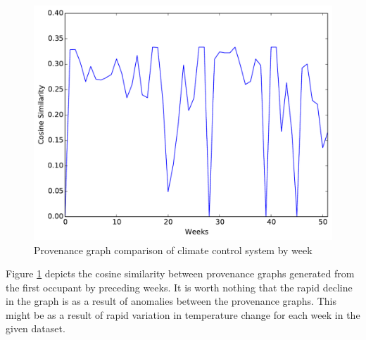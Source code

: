 \begin{figure}[h!]
\begin{center}
\includegraphics[width=\columnwidth]{foo.pdf}
\end{center}
\caption{Provenance graph comparison of climate control system by week}
\label{figure}
\end{figure}


Figure \ref{figure} depicts the cosine similarity between provenance graphs generated from the first occupant by preceding weeks. It is worth nothing that the  rapid decline in the graph is as a result of anomalies between the provenance graphs. This might be as a result of rapid variation in temperature change for each week in the given dataset. 




%




